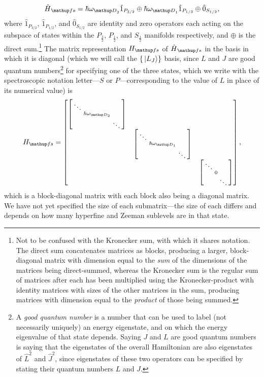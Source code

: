 \begin{align}
\hat H_\up{fs} = 
\hbar\omega_{\up{D}_2} \hat1_{P_{3/2}} \oplus
\hbar\omega_{\up{D}_1} \hat1_{P_{1/2}} \oplus
\hat 0_{S_{1/2}},
\end{align}
where $\hat1_{P_{3/2}}$, $\hat1_{P_{1/2}}$, and $\hat 0_{S_{1/2}}$ are identity and zero operators each acting on the subspace of states within the $P_{\frac32}$, $P_{\frac12}$, and $S_{\frac12}$ manifolds respectively, and $\oplus$ is the direct sum.\footnote{Not to be confused with the Kronecker sum, with which it shares notation. The direct sum concatenates matrices as blocks, producing a larger, block-diagonal matrix with dimension equal to the \emph{sum} of the dimensions of the matrices being direct-summed, whereas the Kronecker sum is the regular sum of matrices after each has been multiplied using the Kronecker-product with identity matrices with sizes of the other matrices in the sum, producing matrices with dimension equal to the \emph{product} of those being summed.} The matrix representation $H_\up{fs}$ of $\hat H_\up{fs}$ in the basis in which it is diagonal (which we will call the $\{\ket{L_J}\}$ basis, since $L$ and $J$ are good quantum numbers\footnote{A \emph{good quantum number} is a number that can be used to label (not necessarily uniquely) an energy eigenstate, and on which the energy eigenvalue of that state depends. Saying $J$ and $L$ are good quantum numbers is saying that the eigenstates of the overall Hamiltonian are also eigenstates of $\hat L^2$ and $\hat J^2$, since eigenstates of these two operators can be specified by stating their quantum numbers $L$ and $J$.} for specifying one of the three states, which we write with the spectroscopic notation letter---$S$ or $P$---corresponding to the value of $L$ in place of its numerical value) is
\begin{align}
H_\up{fs}  = 
\left[\begin{matrix}
    \left[\begin{smallmatrix}\ddots &&\\&\hbar\omega_{\up{D}_2}&\\&&\ddots\\\end{smallmatrix} \right]\\
    & \left[\begin{smallmatrix}\ddots &&\\&\hbar\omega_{\up{D}_1}&\\&&\ddots\\\end{smallmatrix} \right]\\
    & &\left[\begin{smallmatrix}\ddots &&\\&0&\\&&\ddots\\\end{smallmatrix} \right]
\end{matrix} \right],
\end{align}
which is a block-diagonal matrix with each block also being a diagonal matrix. We have not yet specified the size of each submatrix---the size of each differs and depends on how many hyperfine and Zeeman sublevels are in that state.


